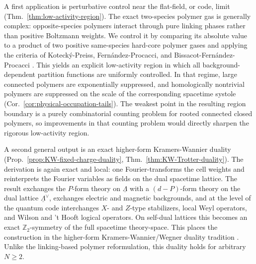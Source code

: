 \documentclass[dvipsnames,a4paper]{article}
\numberwithin{equation}{section}
\theoremstyle{definition}
\theoremstyle{remark}
\begin{document}
A first application is perturbative control near the flat-field, or code, limit
(Thm.~\ref{thm:low-activity-region}). The exact two-species polymer gas is
generally complex: opposite-species polymers interact through pure linking
phases rather than positive Boltzmann weights. We control it by comparing its
absolute value to a product of two positive same-species hard-core polymer gases
and applying the criteria of Koteck\'y-Preiss,
Fern\'andez-Procacci, and Bissacot-Fern\'andez-Procacci
\cite{KoteckyPreiss1986,FernandezProcacci2007,
	BissacotFernandezProcacci2010,Ueltschi2004}. This yields an explicit
low-activity region in which all background-dependent partition functions are
uniformly controlled. In that regime, large connected polymers are
exponentially suppressed, and homologically nontrivial polymers are suppressed
on the scale of the corresponding spacetime systole
(Cor.~\ref{cor:physical-occupation-tails}). The weakest point in the resulting
region boundary is a purely combinatorial counting problem for rooted connected closed
polymers, so improvements in that counting problem would directly sharpen the
rigorous low-activity region.

A second general output is an exact higher-form Kramers-Wannier duality
(Prop.~\ref{prop:KW-fixed-charge-duality},
Thm.~\ref{thm:KW-Trotter-duality}). The derivation is again exact and local: one
Fourier-transforms the cell weights and reinterprets the Fourier variables as
fields on the dual spacetime lattice. The result exchanges the \(P\)-form
theory on \(\underline\Lambda\) with a \((d-P)\)-form theory on the dual lattice
\(\underline\Lambda^\vee\), exchanges electric and magnetic backgrounds, and at
the level of the quantum code interchanges \(X\)- and \(Z\)-type stabilizers,
local Weyl operators, and Wilson and 't Hooft logical operators. On self-dual
lattices this becomes an exact \(\mathbb Z_2\)-symmetry of the full spacetime
theory-space. This places the construction in the
higher-form Kramers-Wannier/Wegner duality tradition
\cite{KramersWannier1941,Wegner:1971app,Savit1980,
	ElitzurPearsonShigemitsu1979,UkawaWindeyGuth1980,Cardy1982,
	CardyRabinovici1982,CobaneraOrtizNussinov2011,FreedTeleman2022,
	DelcampIshtiaque2024}. Unlike the linking-based polymer reformulation, this duality holds for
arbitrary \(N\ge 2\).
\end{document}
